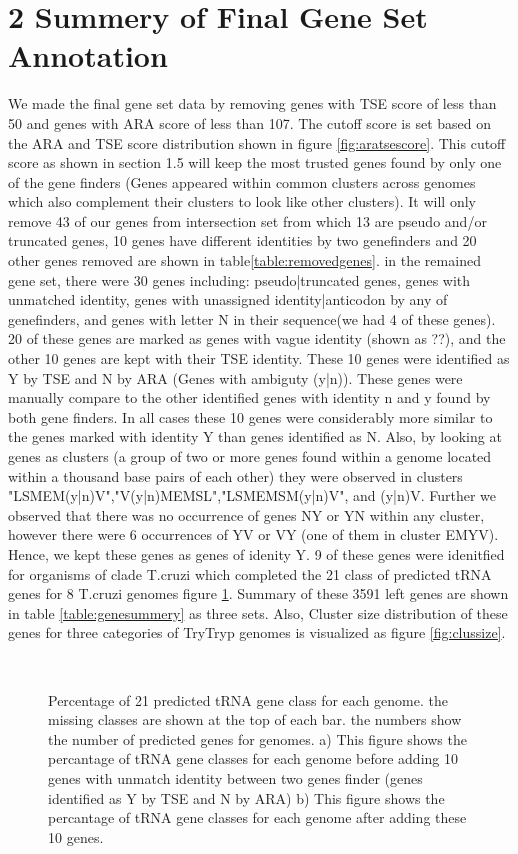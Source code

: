 \documentclass[table,
12pt, %
a4paper, %
oneside, %
headinclude,footinclude, %
BCOR5mm, %
]{scrartcl}
\begin{document}
\section{2 Summery of Final Gene Set Annotation}
We made the final gene set data by removing genes with TSE score of less than 50 and genes with ARA score of less than 107. The cutoff score is set based on the ARA and TSE score distribution shown in figure \ref{fig:aratsescore}. This cutoff score as shown in section 1.5 will keep the most trusted genes found by only one of the gene finders (Genes appeared within common clusters across genomes which also complement their clusters to look like other clusters). It will only remove 43 of our genes from intersection set from which 13 are pseudo and/or truncated genes, 10 genes have different identities by two genefinders and 20 other genes removed are shown in table\ref{table:removedgenes}. in the remained gene set, there were 30 genes including: pseudo|truncated genes, genes with unmatched identity, genes with unassigned identity|anticodon by any of genefinders, and genes with letter N in their sequence(we had 4 of these genes). 20 of these genes are marked as genes with vague identity (shown as ??), and the other 10 genes are kept with their TSE identity. These 10 genes were identified as Y by TSE and N by ARA (Genes with ambiguty (y|n)). These genes were manually compare to the other identified genes with identity n and y found by both gene finders. In all cases these 10 genes were considerably more similar to the genes marked with identity Y than genes identified as N. Also, by looking at genes as clusters (a group of two or more genes found within a genome located within a thousand base pairs of each other) they were observed in clusters "LSMEM(y|n)V","V(y|n)MEMSL","LSMEMSM(y|n)V", and (y|n)V. Further we observed that there was no occurrence of genes NY or YN within any cluster, however there were 6 occurrences of YV or VY (one of them in cluster EMYV). Hence, we kept these genes as genes of idenity Y. 9 of these genes were idenitfied for organisms of clade T.cruzi which completed the 21 class of predicted tRNA genes for 8 T.cruzi genomes figure \ref{fig:genPerc}. Summary of these 3591 left genes are shown in table \ref{table:genesummery} as three sets. Also, Cluster size distribution of these genes for three categories of TryTryp genomes is visualized as figure \ref{fig:clussize}.

\begin{figure}[H]%
  \centering
  \\
  \caption{Percentage of 21 predicted tRNA gene class for each genome. the missing classes are shown at the top of each bar. the numbers show the number of predicted genes for genomes. a) This figure shows the percantage of tRNA gene classes for each genome before adding 10 genes with unmatch identity between two genes finder (genes identified as Y by TSE and N by  ARA) b) This figure shows the percantage of tRNA gene classes for each genome after adding these 10 genes.}%
  \label{fig:genPerc}%
\end{figure}
\end{document}
